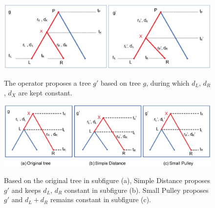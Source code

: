 \documentclass{bmcart}
\begin{document}
\begin{backmatter}
\begin{figure}[h!]
\includegraphics[width=12cm]{Fig02-internalnode.eps}\\
\caption{
             The operator proposes a tree ${g}'$ based on tree $g$, during which $d_L$, $d_R$, $d_X$ are kept constant.}
\label{internalnodes}
\end{figure}

\begin{figure}[h!]
\includegraphics[width=12cm]{Fig03-rootstrategy.eps}\\
\caption{
             Based on the original tree in subfigure (a), Simple Distance proposes ${g}'$ and keeps $d_L$, $d_R$ constant in subfigure (b). Small Pulley proposes ${g}'$ and ${d_L} + {d_R}$ remains constant in subfigure (c).}
\label{simpledistance}
\end{figure}



\end{backmatter}
\end{document}
